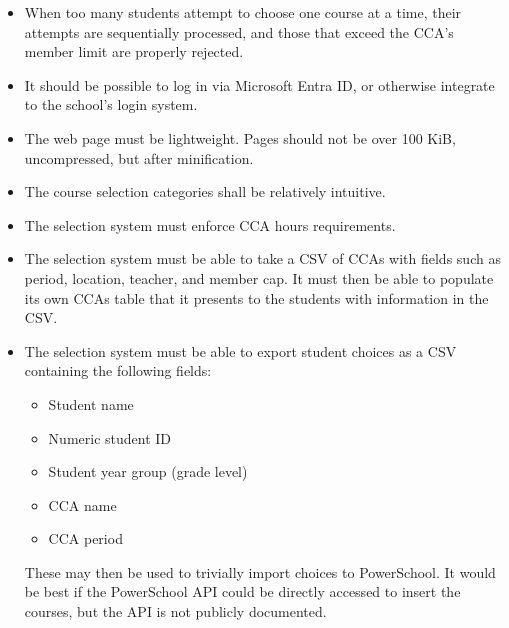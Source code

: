 \begin{itemize}
	\item When too many students attempt to choose one course at a time,
		their attempts are sequentially processed, and those that
		exceed the CCA's member limit are properly rejected. \item It
		should be possible to log in via Microsoft Entra ID, or
		otherwise integrate to the school's login system.
	\item The web page must be lightweight. Pages should not be over 100
		KiB, uncompressed, but after minification.
	\item The course selection categories shall be relatively intuitive.
	\item The selection system must enforce CCA hours requirements.
	\item The selection system must be able to take a CSV of CCAs with
		fields such as period, location, teacher, and member cap. It
		must then be able to populate its own CCAs table that it
		presents to the students with information in the CSV.
	\item The selection system must be able to export student choices as a
		CSV containing the following fields:
		\begin{itemize}
			\item Student name
			\item Numeric student ID
			\item Student year group (grade level)
			\item CCA name
			\item CCA period
		\end{itemize}
		These may then be used to trivially import choices to
		PowerSchool. It would be best if the PowerSchool API could be
		directly accessed to insert the courses, but the API is not
		publicly documented.
\end{itemize}


